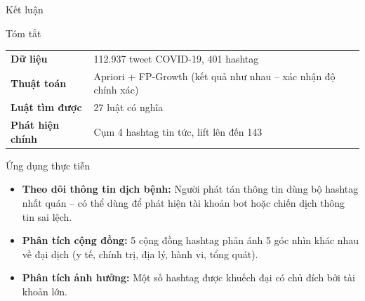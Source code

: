 \documentclass[aspectratio=169]{beamer}
\begin{document}
\begin{frame}{Kết luận}
  \begin{block}{Tóm tắt}
    \begin{tabular}{ll}
      \toprule
      \textbf{Dữ liệu}       & 112.937 tweet COVID-19, 401 hashtag \\
      \textbf{Thuật toán}    & Apriori + FP-Growth (kết quả như nhau -- xác nhận độ chính xác) \\
      \textbf{Luật tìm được} & 27 luật có nghĩa \\
      \textbf{Phát hiện chính} & Cụm 4 hashtag tin tức, lift lên đến 143 \\
      \bottomrule
    \end{tabular}
  \end{block}

  \vspace{0.4em}

  \begin{exampleblock}{Ứng dụng thực tiễn}
    \begin{itemize}
      \item \textbf{Theo dõi thông tin dịch bệnh:} Người phát tán thông tin dùng bộ hashtag nhất quán -- có thể dùng để phát hiện tài khoản bot hoặc chiến dịch thông tin sai lệch.
      \item \textbf{Phân tích cộng đồng:} 5 cộng đồng hashtag phản ánh 5 góc nhìn khác nhau về đại dịch (y tế, chính trị, địa lý, hành vi, tổng quát).
      \item \textbf{Phân tích ảnh hưởng:} Một số hashtag được khuếch đại có chủ đích bởi tài khoản lớn.
    \end{itemize}
  \end{exampleblock}
\end{frame}
\end{document}
